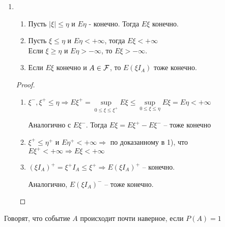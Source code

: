 
\begin{enumerate}[label=\protect\circled{\arabic*},series=mean_properties,start=5]

  \item
    \begin{enumerate}[label=\arabic*)]
      \item 
        Пусть $|\xi| \leq \eta$  и $E \eta$ - конечно. Тогда $E \xi$ конечно.
      
      \item 
        Пусть $\xi \leq \eta$ и $E \eta < +\infty$, тогда $E \xi < +\infty$\\
        Если $\xi \geq \eta$ и $E \eta > -\infty$, то $E \xi > -\infty$.
      
      \item 
        Если $E \xi$ конечно и $A \in \mathcal{F}$, то $E (\xi I_A)$ тоже конечно.
    \end{enumerate}

    \begin{proof}~
      \begin{enumerate}[label=\arabic*)]
        \item 
          $\xi^- , \xi^+ \leq \eta \Rightarrow
          E \xi^+ = \sup\limits_{0 \leq \xi \leq \xi^+} 
          E \xi \leq \sup\limits_{0 \leq \xi \leq \eta} E \xi = E \eta < +\infty$

          Аналогично с $E \xi^-$. Тогда $E \xi = E \xi^+ - E \xi^-$ -- тоже конечно\\

        \item 
          $\xi^+ \leq \eta^+$ и $E \eta^+ < +\infty \Rightarrow$ по доказанному в 1), что \\
          $E \xi^+ < +\infty \Rightarrow E \xi < +\infty$\\

        \item
          $(\xi I_A)^+ = \xi^+ I_A \leq \xi^+ \Rightarrow E(\xi I_A)^+$ -- конечно.

          Аналогично, $E(\xi I_A)^-$ -- тоже конечно.
      \end{enumerate}
    \end{proof}
\end{enumerate}

\begin{definition}
  Говорят, что событие $A$ происходит почти наверное, если $P(A) = 1$
\end{definition}


